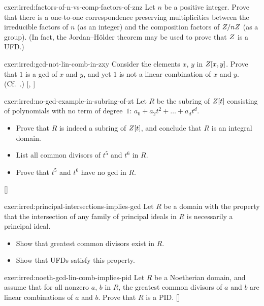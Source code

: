 \begin{exer}{}{exer:irred:factors-of-n-vs-comp-factors-of-znz}
  Let $n$ be a positive integer. Prove that there is a one-to-one
  correspondence preserving multiplicities between the irreducible
  factors of $n$ (as an integer) and the composition factors of
  $Z/nZ$ (as a group). (In fact, the Jordan--H\"older theorem may be
  used to prove that $Z$ is a UFD.)
\end{exer}
\begin{exer}{}{exer:irred:gcd-not-lin-comb-in-zxy}
  \exerused{} Consider the elements $x$, $y$ in $Z[x, y]$. Prove that
  $1$ is a gcd of $x$ and $y$, and yet $1$ is not a linear combination
  of $x$ and $y$. (Cf.\ .)
  [,
  ]
\end{exer}
\begin{exer}{}{exer:irred:no-gcd-example-in-subring-of-zt}
  \exerused{} Let $R$ be the subring of $Z[t]$ consisting of
  polynomials with no term of degree~$1$:
  $a_0 + a_2 t^2 + \dots + a_d t^d$.
  \begin{itemize}
  \item Prove that $R$ is indeed a subring of $Z[t]$, and conclude
    that $R$ is an integral domain.
  \item List all common divisors of $t^5$ and $t^6$ in $R$.
  \item Prove that $t^5$ and $t^6$ have no gcd in $R$.
  \end{itemize}
  []
\end{exer}
\begin{exer}{}{exer:irred:principal-intersections-implies-gcd}
  Let $R$ be a domain with the property that the intersection of any
  family of principal ideals in $R$ is necessarily a principal ideal.
  \begin{itemize}
  \item Show that greatest common divisors exist in $R$.
  \item Show that UFDs satisfy this property.
  \end{itemize}
\end{exer}
\begin{exer}{}{exer:irred:noeth-gcd-lin-comb-implies-pid}
  \exerused{} Let $R$ be a Noetherian domain, and assume that for all
  nonzero $a$, $b$ in $R$, the greatest common divisors of $a$ and $b$
  are linear combinations of $a$ and $b$. Prove that $R$ is a
  PID. []
\end{exer}
